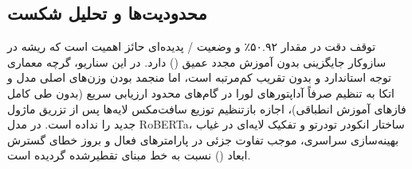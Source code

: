 \subsection{محدودیت‌ها و تحلیل شکست}
توقف دقت در مقدار ۵۰.۹۲٪ و وضعیت  /  پدیده‌ای حائز اهمیت است که ریشه در سازوکار جایگزینی بدون آموزش مجدد عمیق () دارد. در این سناریو، گرچه معماری توجه استاندارد و بدون تقریب کم‌مرتبه است، اما منجمد بودن وزن‌های اصلی مدل و اتکا به تنظیم صرفاً آداپتورهای لورا در گام‌های محدود ارزیابی سریع (بدون طی کامل فازهای آموزش انطباقی)، اجازه بازتنظیم توزیع سافت‌مکس لایه‌ها پس از تزریق ماژول جدید را نداده است. در مدل RoBERTa، ساختار انکودر تودرتو و تفکیک لایه‌ای در غیاب بهینه‌سازی سراسری، موجب تفاوت جزئی در پارامترهای فعال و بروز خطای گسترش ابعاد () نسبت به خط مبنای تقطیرشده گردیده است.
